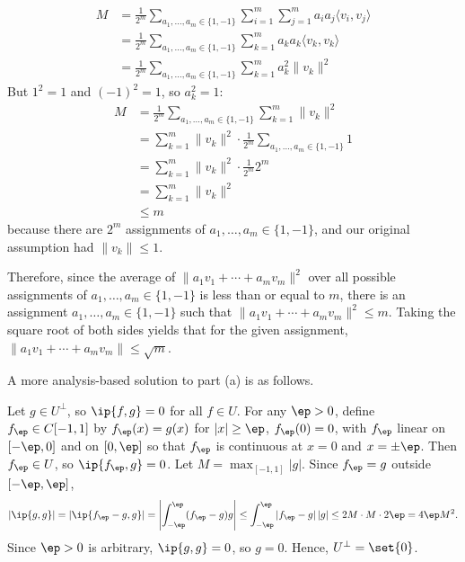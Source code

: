 \begin{coole}
    \begin{align*} 
    M &= \frac{1}{2^m}\sum_{a_1, \dots, a_m \in \{1,-1\}}\sum_{i = 1}^m\sum_{j = 1}^ma_ia_j\langle v_i, v_j\rangle \\
    &= \frac{1}{2^m}\sum_{a_1, \dots, a_m \in \{1,-1\}}\sum_{k = 1}^ma_ka_k\langle v_k, v_k\rangle \\
    &= \frac{1}{2^m}\sum_{a_1, \dots, a_m \in \{1,-1\}}\sum_{k = 1}^ma_k^2\|v_k\|^2
    \end{align*}
    But $1^2 = 1$ and $(-1)^2 = 1$, so $a_k^2 = 1$:
    \begin{align*} 
    M &= \frac{1}{2^m}\sum_{a_1, \dots, a_m \in \{1,-1\}}\sum_{k = 1}^m\|v_k\|^2 \\
    &= \sum_{k=1}^m\|v_k\|^2\cdot\frac{1}{2^m}\sum_{a_1, \dots, a_m \in \{1, -1\}}1 \\
    &= \sum_{k=1}^m\|v_k\|^2\cdot\frac{1}{2^m}2^m \\
    &= \sum_{k=1}^m\|v_k\|^2 \\
    &\leq m
    \end{align*}
    because there are $2^m$ assignments of $a_1, \dots, a_m \in \{1, -1\}$, and our original assumption had $\|v_k\| \leq 1$.

    Therefore, since the average of $\|a_1v_1 + \cdots + a_mv_m\|^2$ over all possible assignments of $a_1, \dots, a_m \in \{1, -1\}$ is less than or equal to $m$, there is an assignment $a_1, \dots, a_m \in \{1, -1\}$ such that $\|a_1v_1 + \cdots + a_mv_m\|^2 \leq m$. Taking the square root of both sides yields that for the given assignment, $\|a_1v_1 + \cdots + a_mv_m\| \leq \sqrt{m}$.
\end{coole}


A more analysis-based solution to part (a) is as follows.

\begin{me}
    Let $g \in U^\perp$, so $\ip{f, g} = 0$ for all $f \in U$.
    For any $\ep > 0$, define $f_\ep \in C[-1, 1]$ by $f_\ep(x) = g(x)$ for $|x| \geq \ep$, $f_\ep(0) = 0$, with $f_\ep$ linear on $[-\ep, 0]$ and on $[0, \ep]$ so that $f_\ep$ is continuous at $x = 0$ and $x = \pm \ep$.
    Then $f_\ep \in U$, so $\ip{f_\ep, g} = 0$.
    Let $M = \max_{[-1,1]} |g|$.
    Since $f_\ep = g$ outside $[-\ep, \ep]$,
    \[
        |\ip{g, g}| = |\ip{f_\ep - g, g}| = \left|\int_{-\ep}^{\ep} (f_\ep - g)g\right| \leq \int_{-\ep}^{\ep} |f_\ep - g|\,|g| \leq 2M \cdot M \cdot 2\ep = 4\ep M^2.
    \]
    Since $\ep > 0$ is arbitrary, $\ip{g, g} = 0$, so $g = 0$.
    Hence, $U^\perp = \set{0}$.
\end{me}